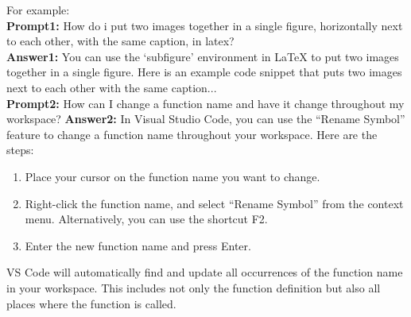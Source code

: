 \documentclass[draft, a4paper,12pt]{article}
\begin{document}
\noindent For example: \\
\noindent \textbf{Prompt1:} How do i put two images together in a single figure, horizontally next to each other, with the same caption, in latex? \\
\noindent \textbf{Answer1:} You can use the `subfigure' environment in LaTeX to put two images together in a single figure. Here is an example code snippet that puts two images next to each other with the same caption... \\
\noindent \textbf{Prompt2:} How can I change a function name and have it change throughout my workspace?
\noindent \textbf{Answer2:} In Visual Studio Code, you can use the ``Rename Symbol'' feature to change a function name throughout your workspace. Here are the steps:
\begin{enumerate}
    \item Place your cursor on the function name you want to change.
    \item Right-click the function name, and select ``Rename Symbol'' from the context menu. Alternatively, you can use the shortcut F2.
    \item Enter the new function name and press Enter.
\end{enumerate}
VS Code will automatically find and update all occurrences of the function name in your workspace. This includes not only the function definition but also all places where the function is called.
\end{document}
